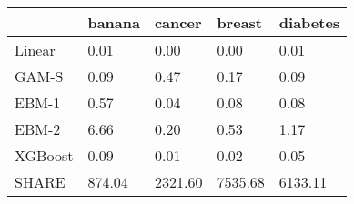 \begin{tabular}{lllll}
\toprule
{} &  banana &   cancer &   breast & diabetes \\
\midrule
Linear  &    0.01 &     0.00 &     0.00 &     0.01 \\
GAM-S   &    0.09 &     0.47 &     0.17 &     0.09 \\
EBM-1   &    0.57 &     0.04 &     0.08 &     0.08 \\
EBM-2   &    6.66 &     0.20 &     0.53 &     1.17 \\
XGBoost &    0.09 &     0.01 &     0.02 &     0.05 \\
SHARE   &  874.04 &  2321.60 &  7535.68 &  6133.11 \\
\bottomrule
\end{tabular}
